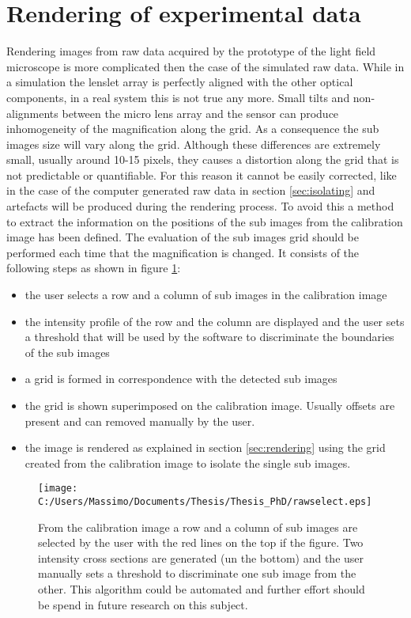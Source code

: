 \section{Rendering of experimental data}
Rendering images from raw data acquired by the prototype of the light field microscope is more complicated then the case of the simulated raw data. While in a simulation the lenslet array is perfectly aligned with the other optical components, in a real system this is not true any more. Small tilts and non-alignments between the micro lens array and the sensor can produce inhomogeneity of the magnification along the grid. As a consequence the sub images size will vary along the grid. Although these differences are extremely small, usually around 10-15 pixels, they causes a distortion along the grid that is not predictable or quantifiable. For this reason it cannot be easily corrected, like in the case of the computer generated raw data in section \ref{sec:isolating} and artefacts will be produced during the rendering process. To avoid this a method to extract the information on the positions of the sub images from the calibration image has been defined. The evaluation of the sub images grid should be performed each time that the magnification is changed. It consists of the following steps as shown in figure \ref{fig:renderingreal}:
\begin{itemize}
	\item the user selects a row and a column of sub images in the calibration image 
	\item the intensity profile of the row and the column are displayed and the user sets a threshold that will be used by the software to discriminate the boundaries of the sub images
	\item a grid is formed in correspondence with the detected sub images 
	\item the grid is shown superimposed on the calibration image. Usually offsets are present and can removed manually by the user.
	\item the image is rendered as explained in section \ref{sec:rendering} using the grid created from the calibration image to isolate the single sub images.
\end{itemize}
\begin{figure}[H]
	\centering
	\texttt{[image: C:/Users/Massimo/Documents/Thesis/Thesis\_PhD/rawselect.eps]}
	\caption{\label{fig:renderingreal} From the calibration image a row and a column of sub images are selected by the user with the red lines on the top if the figure. Two intensity cross sections are generated (un the bottom) and the user manually sets a threshold to discriminate one sub image from the other. This algorithm could be automated and further effort should be spend in future research on this subject.}
\end{figure}
